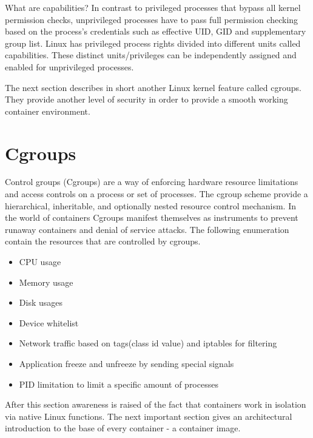 What are capabilities? In contrast to privileged processes that bypass all kernel permission checks, unprivileged processes have to pass full permission checking based on the process’s credentials such as effective UID, GID and supplementary group list. Linux has privileged process rights divided into different units called capabilities. These distinct units/privileges can be independently assigned and enabled for unprivileged processes.

The next section describes in short another Linux kernel feature called cgroups. They provide another level of security in order to provide a smooth working container environment.

\section{Cgroups}
\label{sec:intro:containerization:cgroups}
Control groups (Cgroups) are a way of enforcing hardware resource limitations and access controls on a process or set of processes. The cgroup scheme provide a hierarchical, inheritable, and optionally nested resource control mechanism.
In the world of containers Cgroups manifest themselves as instruments to prevent runaway containers and denial of service attacks.
The following enumeration contain the resources that are controlled by cgroups.
\begin{itemize}
\item CPU usage
\item Memory usage
\item Disk usages
\item Device whitelist
\item Network traffic based on tags(class id value) and iptables for filtering
\item Application freeze and unfreeze by sending special signals
\item PID limitation to limit a specific amount of processes 
\end{itemize}

After this section awareness is raised of the fact that containers work in isolation via native Linux functions.
The next important section gives an architectural introduction to the base of every container - a container image.
